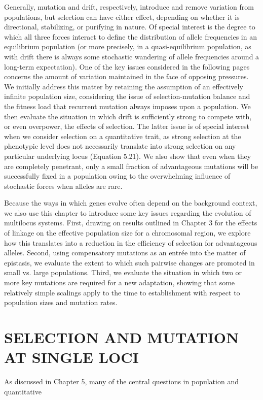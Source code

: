 \documentclass{article}
\begin{document}
Generally, mutation and drift, respectively, introduce and remove variation from populations, but selection can have either effect, depending on whether it is directional, stabilizing, or purifying in nature. Of special interest is the degree to which all three forces interact to define the distribution of allele frequencies in an equilibrium population (or more precisely, in a quasi-equilibrium population, as with drift there is always some stochastic wandering of allele frequencies around a long-term expectation). One of the key issues considered in the following pages concerns the amount of variation maintained in the face of opposing pressures. We initially address this matter by retaining the assumption of an effectively infinite population size, considering the issue of selection-mutation balance and the fitness load that recurrent mutation always imposes upon a population. We then evaluate the situation in which drift is sufficiently strong to compete with, or even overpower, the effects of selection. The latter issue is of special interest when we consider selection on a quantitative trait, as strong selection at the phenotypic level does not necessarily translate into strong selection on any particular underlying locus (Equation 5.21). We also show that even when they are completely penetrant, only a small fraction of advantageous mutations will be successfully fixed in a population owing to the overwhelming influence of stochastic forces when alleles are rare.

Because the ways in which genes evolve often depend on the background context, we also use this chapter to introduce some key issues regarding the evolution of multilocus systems. First, drawing on results outlined in Chapter 3 for the effects of linkage on the effective population size for a chromosomal region, we explore how this translates into a reduction in the efficiency of selection for advantageous alleles. Second, using compensatory mutations as an entrée into the matter of epistasis, we evaluate the extent to which such pairwise changes are promoted in small vs. large populations. Third, we evaluate the situation in which two or more key mutations are required for a new adaptation, showing that some relatively simple scalings apply to the time to establishment with respect to population sizes and mutation rates.

\section{SELECTION AND MUTATION AT SINGLE LOCI}
As discussed in Chapter 5, many of the central questions in population and quantitative
\end{document}
